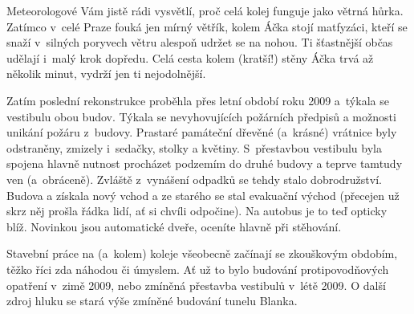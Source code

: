 Meteorologové Vám jistě rádi vysvětlí, proč celá kolej funguje
jako větrná hůrka. Zatímco v~celé Praze fouká jen mírný větřík,
kolem Áčka stojí matfyzáci, kteří se snaží v~silných poryvech
větru alespoň udržet se na nohou. Ti šťastnější občas udělají
i~malý krok dopředu. Celá cesta kolem (kratší!) stěny Áčka trvá až
několik minut, vydrží jen ti nejodolnější.


Zatím poslední rekonstrukce proběhla přes letní období roku 2009
a~týkala se vestibulu obou budov. Týkala se nevyhovujících
požárních předpisů a možnosti unikání požáru z~budovy. Prastaré
památeční dřevěné (a~krásné) vrátnice byly odstraněny, zmizely
i~sedačky, stolky a květiny. S~přestavbou vestibulu byla spojena
hlavně nutnost procházet podzemím do druhé budovy a teprve tamtudy
ven (a~obráceně). Zvláště z~vynášení odpadků se tehdy stalo
dobrodružství. Budova a získala nový vchod a ze starého se stal
evakuační východ (přecejen už skrz něj prošla řádka lidí, ať si
chvíli odpočine). Na autobus je to teď opticky blíž. Novinkou jsou
automatické dveře, oceníte hlavně při stěhování.

Stavební práce na (a~kolem) koleje všeobecně začínají se
zkouškovým obdobím, těžko říci zda náhodou či úmyslem. Ať už to
bylo budování protipovodňových opatření v~zimě 2009, nebo zmíněná
přestavba vestibulů v~létě 2009. O další zdroj hluku se stará výše
zmíněné budování tunelu Blanka.

%

